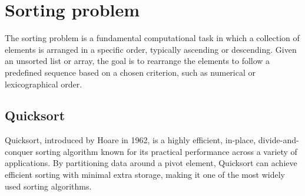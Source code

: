 \section{Sorting problem}

The sorting problem is a fundamental computational task in which a collection of elements is arranged in a specific order, typically ascending or descending. 
Given an unsorted list or array, the goal is to rearrange the elements to follow a predefined sequence based on a chosen criterion, such as numerical or lexicographical order. 

\subsection{Quicksort}
Quicksort, introduced by Hoare in 1962, is a highly efficient, in-place, divide-and-conquer sorting algorithm known for its practical performance across a variety of applications.
By partitioning data around a pivot element, Quicksort can achieve efficient sorting with minimal extra storage, making it one of the most widely used sorting algorithms.

